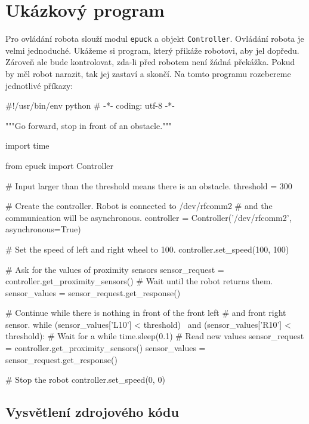 \section{Ukázkový program}
\label{ukazkovy_program}

    Pro ovládání robota slouží modul {\tt epuck} a objekt {\tt Controller}.
    Ovládání robota je velmi jednoduché. Ukážeme si program, který přikáže
    robotovi, aby jel dopředu. Zároveň ale bude kontrolovat, zda-li před
    robotem není žádná překážka. Pokud by měl robot narazit, tak jej zastaví a
    skončí. Na tomto programu rozebereme jednotlivé příkazy:

\begin{mylisting}
\begin{pyc}
#!/usr/bin/env python
# -*- coding: utf-8 -*-

"""Go forward, stop in front of an obstacle."""

import time

from epuck import Controller

# Input larger than the threshold means there is an obstacle.
threshold = 300

# Create the controller. Robot is connected to /dev/rfcomm2
# and the communication will be asynchronous.
controller = Controller('/dev/rfcomm2', asynchronous=True)

# Set the speed of left and right wheel to 100.
controller.set_speed(100, 100)

# Ask for the values of proximity sensors
sensor_request = controller.get_proximity_sensors()
# Wait until the robot returns them.
sensor_values = sensor_request.get_response()

# Continue while there is nothing in front of the front left
# and front right sensor.
while (sensor_values['L10'] < threshold) \
       and (sensor_values['R10'] < threshold):
    # Wait for a while
    time.sleep(0.1)
    # Read new values
    sensor_request = controller.get_proximity_sensors()
    sensor_values = sensor_request.get_response()

# Stop the robot
controller.set_speed(0, 0)
\end{pyc}
\label{lst:simple_example}
\end{mylisting}

\subsection{Vysvětlení zdrojového kódu}

